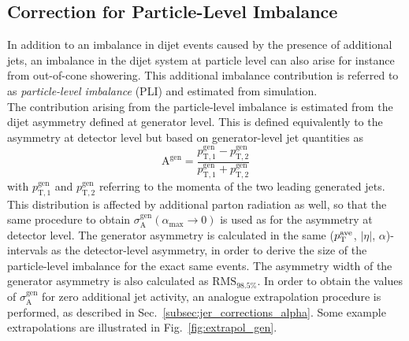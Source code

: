 \subsection{Correction for Particle-Level Imbalance}
\label{subsec:jer_corrections_pli}
In addition to an imbalance in dijet events caused by the presence of additional jets, an imbalance in the dijet system at particle level can also arise for instance from out-of-cone showering. This additional imbalance contribution is referred to as \textit{particle-level imbalance} (PLI) and estimated from simulation. \\
The contribution arising from the particle-level imbalance is estimated from the dijet asymmetry defined at generator level. This is defined equivalently to the asymmetry at detector level but based on generator-level jet quantities as
\begin{equation}
  \mathrm{A^{gen}} = \frac{p_\mathrm{T,1}^\mathrm{gen} - p_\mathrm{T,2}^\mathrm{gen}}{p_\mathrm{T,1}^\mathrm{gen} + p_\mathrm{T,2}^\mathrm{gen}} 
 \end{equation}
with $p_\mathrm{T,1}^\mathrm{gen}$ and $p_\mathrm{T,2}^\mathrm{gen}$ referring to the momenta of the two leading generated jets. This distribution is affected by additional parton radiation as well, so that the same procedure to obtain $\sigma^\mathrm{gen}_\mathrm{A}(\alpha_\mathrm{max} \rightarrow 0)$ is used as for the asymmetry at detector level. The generator asymmetry is calculated in the same ($p_{\text{T}}^\mathrm{ave}$, $|\eta|$, $\alpha$)-intervals as the detector-level asymmetry, in order to derive the size of the particle-level imbalance for the exact same events. The asymmetry width of the generator asymmetry is also calculated as $\mathrm{RMS}_{98.5\%}$. In order to obtain the values of $\sigma^\mathrm{gen}_\mathrm{A}$ for zero additional jet activity, an analogue extrapolation procedure is performed, as described in Sec.~\ref{subsec:jer_corrections_alpha}. Some example extrapolations are illustrated in Fig.~\ref{fig:extrapol_gen}. 
